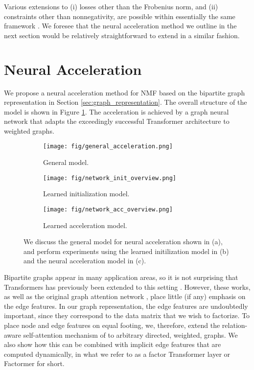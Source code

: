 \documentclass{article}
\begin{document}
Various extensions to (i) losses other than the Frobenius norm, and (ii) constraints other than nonnegativity, are possible within essentially the same framework \citep{Huang2016, Udell2016}. We foresee that the neural acceleration method we outline in the next section would be relatively straightforward to extend in a similar fashion.

\section{Neural Acceleration}
We propose a neural acceleration method for NMF based on the bipartite graph representation in Section \ref{sec:graph_representation}. The overall structure of the model is shown in Figure \ref{fig:overview_general_acc_model}. The acceleration is achieved by a graph neural network that adapts the exceedingly successful Transformer architecture \citep{Vaswani2017} to weighted graphs.
\begin{figure}

\centering
\begin{subfigure}{.99\columnwidth}
\centering
\texttt{[image: fig/general\_acceleration.png]}%
\caption{General model.}%
\label{fig:overview_general_acc_model}%
\end{subfigure}\hfill%
\vspace{0.2in}
\begin{subfigure}{.99\columnwidth}
\centering
\texttt{[image: fig/network\_init\_overview.png]}%
\caption{Learned initialization model.}%
\label{fig:overview_init_model}%
\end{subfigure}\hfill%
\vspace{0.2in}
\begin{subfigure}{.99\columnwidth}
\centering
\texttt{[image: fig/network\_acc\_overview.png]}%
\caption{Learned acceleration model.}%
\label{fig:overview_acc_model}%
\end{subfigure}%
\caption{We discuss the general model for neural acceleration shown in (a), and perform experiments using the learned initilization model in (b) and the neural acceleration model in (c).}%
\label{fig:models}%
\end{figure}


Bipartite graphs appear in many application areas, so it is not surprising that Transformers has previously been extended to this setting \citep{Shu2020, hudson2021ganformer}. However, these works, as well as the original graph attention network \citep{Velickovic2017}, place little (if any) emphasis on the edge features. In our graph representation, the edge features are undoubtedly important, since they correspond to the data matrix that we wish to factorize. To place node and edge features on equal footing, we, therefore, extend the relation-aware self-attention mechanism of \citet{Shaw2018} to arbitrary directed, weighted, graphs. We also show how this can be combined with implicit edge features that are computed dynamically, in what we refer to as a factor Transformer layer or Factormer for short.
\end{document}
